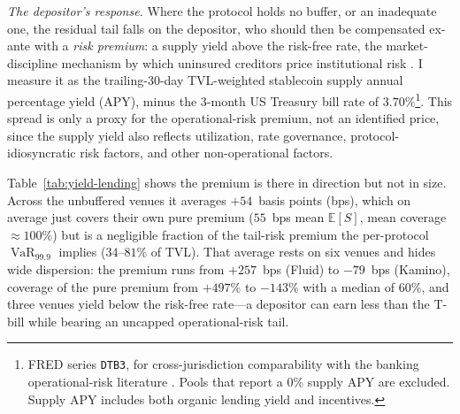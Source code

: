 \documentclass[runningheads]{llncs}
\newcommand{\E}{\mathbb{E}}
\newcommand{\VaR}{\operatorname{VaR}}
\begin{document}
\emph{The depositor's response.} Where the protocol holds no buffer, or
an inadequate one, the residual tail falls on the depositor, who should
then be compensated ex-ante with a \emph{risk premium}: a supply yield
above the risk-free rate, the market-discipline mechanism by which
uninsured creditors price institutional risk
\citep{Flannery1998,Egan2017}. I measure it as the trailing-30-day
TVL-weighted stablecoin supply annual percentage yield (APY),
minus the 3-month US Treasury bill rate of $3.70\%$\footnote{FRED series
\texttt{DTB3}, for cross-jurisdiction comparability with the
banking operational-risk literature \citep{Moscadelli2004,Fontnouvelle2006}.
Pools that report a $0\%$ supply APY are excluded. Supply APY includes both
organic lending yield and incentives.}. This
spread is only a proxy for the operational-risk premium, not an
identified price, since the supply yield also reflects utilization, 
rate governance, protocol-idiosyncratic risk factors, and other non-operational factors.

Table~\ref{tab:yield-lending} shows the premium is there in direction
but not in size. Across the unbuffered venues it averages $+54$~basis
points (bps), which on average just covers their own pure premium
($55$~bps mean $\E[S]$, mean coverage $\approx 100\%$) but is a negligible
fraction of the tail-risk premium the per-protocol $\VaR_{99.9}$
implies ($34$--$81\%$ of TVL). That average rests on six venues and hides
wide dispersion: the premium runs from $+257$~bps (Fluid) to $-79$~bps
(Kamino), coverage of the pure premium from $+497\%$ to $-143\%$ with a
median of $60\%$, and three venues yield below the risk-free rate---a
depositor can earn less than the T-bill while bearing an uncapped
operational-risk tail.
\end{document}
